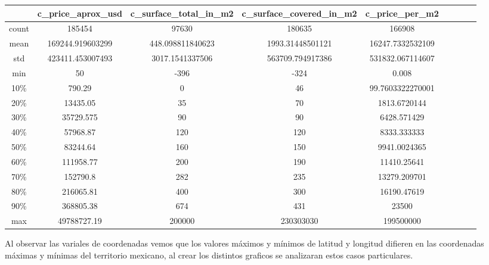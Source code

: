 \documentclass{report}
\begin{document}
\begin{center}
\begin{tabular}{||c|c|c|c|c|c|c|c|c||}
\hline
      & c\_price\_aprox\_usd & c\_surface\_total\_in\_m2 & c\_surface\_covered\_in\_m2 & c\_price\_per\_m2 \\
\hline\hline
count & 185454               & 97630                     & 180635                      & 166908            \\
mean  & 169244.919603299     & 448.098811840623          & 1993.31448501121            & 16247.7332532109  \\
std   & 423411.453007493     & 3017.1541337506           & 563709.794917386            & 531832.067114607  \\
min   & 50                   & -396                      & -324                        & 0.008             \\
10\%  & 790.29               & 0                         & 46                          & 99.7603322270001  \\
20\%  & 13435.05             & 35                        & 70                          & 1813.6720144      \\
30\%  & 35729.575            & 90                        & 90                          & 6428.571429       \\
40\%  & 57968.87             & 120                       & 120                         & 8333.333333       \\
50\%  & 83244.64             & 160                       & 150                         & 9941.0024365      \\
60\%  & 111958.77            & 200                       & 190                         & 11410.25641       \\
70\%  & 152790.8             & 282                       & 235                         & 13279.209701      \\
80\%  & 216065.81            & 400                       & 300                         & 16190.47619       \\
90\%  & 368805.38            & 674                       & 431                         & 23500             \\
max   & 49788727.19          & 200000                    & 230303030                   & 199500000        \\

\hline
\end{tabular}
\end{center}

Al observar las variales de coordenadas vemos que los valores máximos y mínimos de latitud y longitud difieren en las coordenadas máximas y mínimas del territorio mexicano, al crear los distintos graficos se analizaran estos casos particulares.\\
\end{document}
